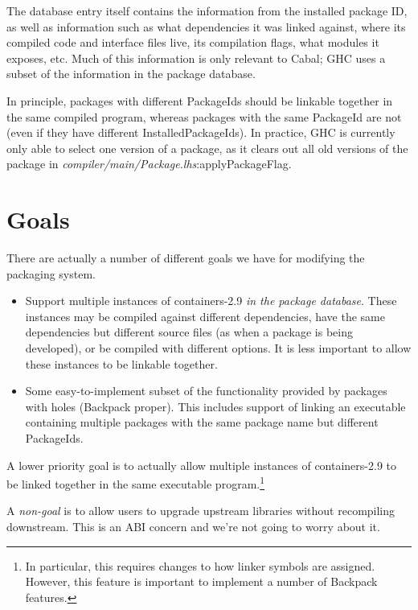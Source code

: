 \documentclass{article}
\newcommand{\ghcfile}[1]{\textsl{#1}}
\begin{document}
The database entry itself contains the information from the installed package ID,
as well as information such as what dependencies it was linked against, where
its compiled code and interface files live, its compilation flags, what modules
it exposes, etc.  Much of this information is only relevant to Cabal; GHC
uses a subset of the information in the package database.

In principle, packages with different PackageIds should be linkable
together in the same compiled program, whereas packages with the same
PackageId are not (even if they have different InstalledPackageIds).  In
practice, GHC is currently only able to select one version of a package,
as it clears out all old versions of the package in
\ghcfile{compiler/main/Package.lhs}:applyPackageFlag.

\section{Goals}

There are actually a number of different goals we have for modifying the
packaging system.

\begin{itemize}
    \item Support multiple instances of containers-2.9 \emph{in the
        package database}.  These instances may be compiled against
        different dependencies, have the same dependencies but different
        source files (as when a package is being developed), or be
        compiled with different options.  It is less important to allow
        these instances to be linkable together.

    \item Some easy-to-implement subset of the functionality provided by
        packages with holes (Backpack proper).  This includes support
        of linking an executable containing multiple packages with the
        same package name but different PackageIds.
\end{itemize}

A lower priority goal is to actually allow multiple instances of
containers-2.9 to be linked together in the same executable
program.\footnote{In particular, this requires changes to how linker symbols
are assigned. However, this feature is important to implement a number
of Backpack features.}

A \emph{non-goal} is to allow users to upgrade upstream libraries
without recompiling downstream. This is an ABI concern and we're not
going to worry about it.
\end{document}
